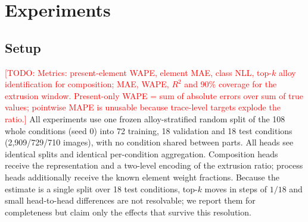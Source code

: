 \documentclass{article}
\newcommand{\todo}[1]{\textcolor{red}{[TODO: #1]}}
\begin{document}
\section{Experiments}
\label{sec:experiments}

\subsection{Setup}
\todo{Metrics: present-element WAPE, element MAE, class NLL, top-$k$ alloy
identification for composition; MAE, WAPE, $R^2$ and 90\% coverage for the
extrusion window. Present-only WAPE = sum of absolute errors over sum of true
values; pointwise MAPE is unusable because trace-level targets explode the
ratio.}
All experiments use one frozen alloy-stratified random split of the 108 whole
conditions (seed 0) into 72 training, 18 validation and 18 test conditions
(2{,}909/729/710 images), with no condition shared between parts. All heads
see identical splits and identical per-condition aggregation. Composition
heads receive the representation and a two-level encoding of the extrusion
ratio; process heads additionally receive the known element weight fractions.
Because the estimate is a single split over 18 test conditions, top-$k$ moves
in steps of $1/18$ and small head-to-head differences are not resolvable; we
report them for completeness but claim only the effects that survive this
resolution.
\end{document}
